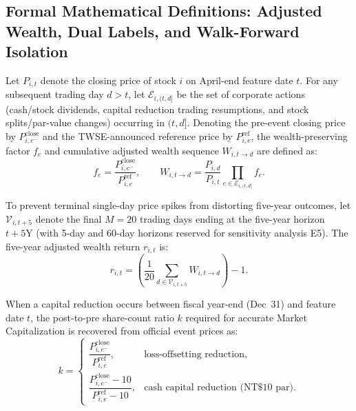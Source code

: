 \documentclass[conference]{IEEEtran}
\begin{document}
\subsection{Formal Mathematical Definitions: Adjusted Wealth, Dual Labels, and Walk-Forward Isolation}
Let $P_{i,t}$ denote the closing price of stock $i$ on April-end feature date $t$. For any subsequent trading day $d > t$, let $\mathcal{E}_{i,(t,d]}$ be the set of corporate actions (cash/stock dividends, capital reduction trading resumptions, and stock splits/par-value changes) occurring in $(t, d]$. Denoting the pre-event closing price by $P_{i,e^-}^{\text{close}}$ and the TWSE-announced reference price by $P_{i,e}^{\text{ref}}$, the wealth-preserving factor $f_e$ and cumulative adjusted wealth sequence $W_{i, t \to d}$ are defined as:
\begin{equation}
\label{eq:wealth}
f_e = \frac{P_{i, e^-}^{\text{close}}}{P_{i, e}^{\text{ref}}}, \qquad W_{i, t \to d} = \frac{P_{i,d}}{P_{i,t}} \prod_{e \in \mathcal{E}_{i,(t,d]}} f_e.
\end{equation}

To prevent terminal single-day price spikes from distorting five-year outcomes, let $\mathcal{V}_{i, t+5}$ denote the final $M = 20$ trading days ending at the five-year horizon $t + 5\text{Y}$ (with 5-day and 60-day horizons reserved for sensitivity analysis E5). The five-year adjusted wealth return $r_{i,t}$ is:
\begin{equation}
\label{eq:return}
r_{i,t} = \left( \frac{1}{20} \sum_{d \in \mathcal{V}_{i, t+5}} W_{i, t \to d} \right) - 1.
\end{equation}

When a capital reduction occurs between fiscal year-end (Dec~31) and feature date $t$, the post-to-pre share-count ratio $k$ required for accurate Market Capitalization is recovered from official event prices as:
\begin{equation}
\label{eq:ratio_k}
k = \begin{cases}
\dfrac{P_{i,e^-}^{\text{close}}}{P_{i,e}^{\text{ref}}}, & \text{loss-offsetting reduction}, \\[9pt]
\dfrac{P_{i,e^-}^{\text{close}} - 10}{P_{i,e}^{\text{ref}} - 10}, & \text{cash capital reduction (NT\$10 par)}.
\end{cases}
\end{equation}
\end{document}
